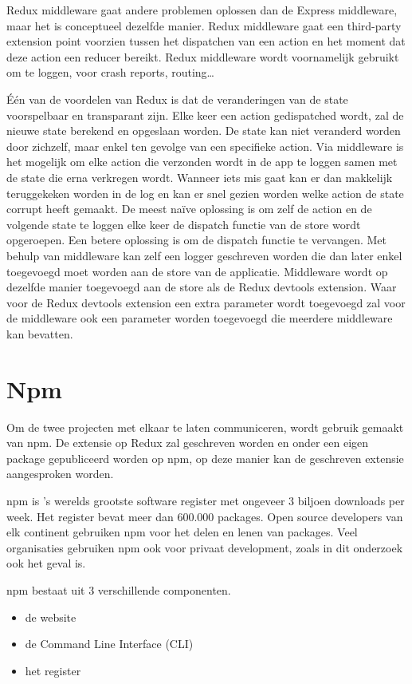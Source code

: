 Redux middleware gaat andere problemen oplossen dan de Express middleware, maar het is conceptueel dezelfde manier. Redux middleware gaat een third-party extension point voorzien tussen het dispatchen van een action en het moment dat deze action een reducer bereikt. Redux middleware wordt voornamelijk gebruikt om te loggen, voor crash reports, routing…

Één van de voordelen van Redux is dat de veranderingen van de state voorspelbaar en transparant zijn. Elke keer een action gedispatched wordt, zal de nieuwe state berekend en opgeslaan worden. De state kan niet veranderd worden door zichzelf, maar enkel ten gevolge van een specifieke action. Via middleware is het mogelijk om elke action die verzonden wordt in de app te loggen samen met de state die erna verkregen wordt. Wanneer iets mis gaat kan er dan makkelijk teruggekeken worden in de log en kan er snel gezien worden welke action de state corrupt heeft gemaakt. De meest naïve oplossing is om zelf de action en de volgende state te loggen elke keer de dispatch functie van de store wordt opgeroepen. Een betere oplossing is om de dispatch functie te vervangen. Met behulp van middleware kan zelf een logger geschreven worden die dan later enkel toegevoegd moet worden aan de store van de applicatie. Middleware wordt op dezelfde manier toegevoegd aan de store als de Redux devtools extension. Waar voor de Redux devtools extension een extra parameter wordt toegevoegd zal voor de middleware ook een parameter worden toegevoegd die meerdere middleware kan bevatten. 
\autocite{Redux02}


\section{Npm}
Om de twee projecten met elkaar te laten communiceren, wordt gebruik gemaakt van npm. De extensie op Redux zal geschreven worden en onder een eigen package gepubliceerd worden op npm, op deze manier kan de geschreven extensie aangesproken worden. 

npm is 's werelds grootste software register met ongeveer 3 biljoen downloads per week. Het register bevat meer dan 600.000 packages. Open source developers van elk continent gebruiken npm voor het delen en lenen van packages. Veel organisaties gebruiken npm ook voor privaat development, zoals in dit onderzoek ook het geval is. 

npm bestaat uit 3 verschillende componenten.
\begin{itemize}
	\item de website
	\item de Command Line Interface (CLI)
	\item het register
	
\end{itemize}

